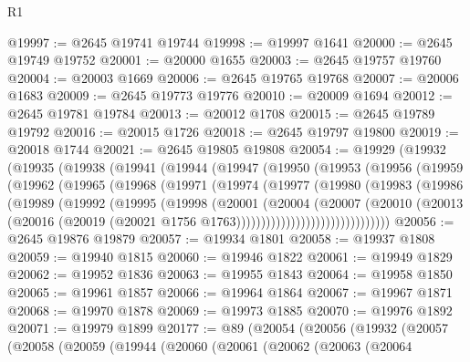 \begin{lexlean}{R1}
\begin{coremodule}
@19997 := @2645 @19741 @19744
@19998 := @19997 @1641
@20000 := @2645 @19749 @19752
@20001 := @20000 @1655
@20003 := @2645 @19757 @19760
@20004 := @20003 @1669
@20006 := @2645 @19765 @19768
@20007 := @20006 @1683
@20009 := @2645 @19773 @19776
@20010 := @20009 @1694
@20012 := @2645 @19781 @19784
@20013 := @20012 @1708
@20015 := @2645 @19789 @19792
@20016 := @20015 @1726
@20018 := @2645 @19797 @19800
@20019 := @20018 @1744
@20021 := @2645 @19805 @19808
@20054 := @19929
    (@19932
      (@19935
        (@19938
          (@19941
            (@19944
              (@19947
                (@19950
                  (@19953
                    (@19956
                      (@19959
                        (@19962
                          (@19965
                            (@19968
                              (@19971
                                (@19974
                                  (@19977
                                    (@19980
                                      (@19983
                                        (@19986
                                          (@19989
                                            (@19992
                                              (@19995
                                                (@19998
                                                  (@20001
                                                    (@20004
                                                      (@20007
                                                        (@20010
                                                          (@20013
                                                            (@20016
                                                              (@20019
                                                                (@20021
                                                                  @1756
                                                                  @1763)))))))))))))))))))))))))))))))
@20056 := @2645 @19876 @19879
@20057 := @19934 @1801
@20058 := @19937 @1808
@20059 := @19940 @1815
@20060 := @19946 @1822
@20061 := @19949 @1829
@20062 := @19952 @1836
@20063 := @19955 @1843
@20064 := @19958 @1850
@20065 := @19961 @1857
@20066 := @19964 @1864
@20067 := @19967 @1871
@20068 := @19970 @1878
@20069 := @19973 @1885
@20070 := @19976 @1892
@20071 := @19979 @1899
@20177 := @89
    (@20054
      (@20056
        (@19932
          (@20057
            (@20058
              (@20059
                (@19944
                  (@20060
                    (@20061
                      (@20062
                        (@20063
                          (@20064

\end{coremodule}
\end{lexlean}
